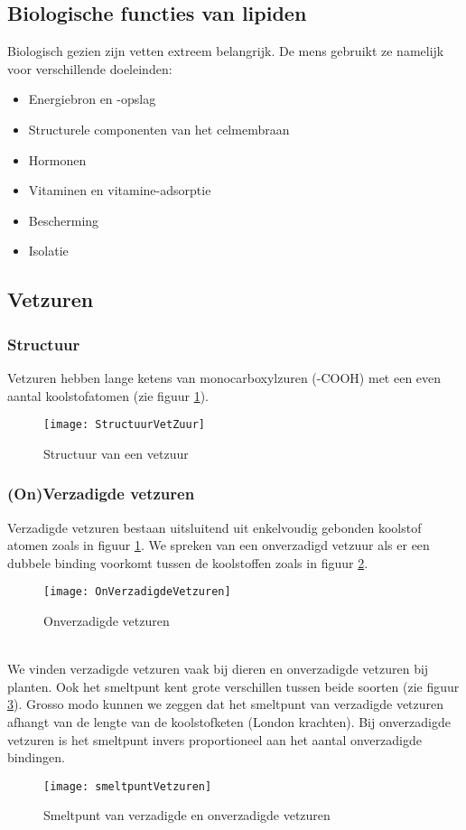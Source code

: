 \documentclass[a4paper,kul]{kulakarticle} %
\begin{document}
\subsection{Biologische functies van lipiden}
Biologisch gezien zijn vetten extreem belangrijk. De mens gebruikt ze namelijk voor verschillende doeleinden:
\begin{itemize}
	\item Energiebron en -opslag
	\item Structurele componenten van het celmembraan
	\item Hormonen
	\item Vitaminen en vitamine-adsorptie
	\item Bescherming
	\item Isolatie
\end{itemize}
\subsection{Vetzuren}
\subsubsection{Structuur}
Vetzuren hebben lange ketens van monocarboxylzuren (-COOH) met een even aantal koolstofatomen (zie figuur \ref{fig:structuurvetzuur}).
\begin{figure}[h]
	\centering
	\texttt{[image: StructuurVetZuur]}
	\caption[Vetzuur]{Structuur van een vetzuur}
	\label{fig:structuurvetzuur}
\end{figure}
\subsubsection{(On)Verzadigde vetzuren}
Verzadigde vetzuren bestaan uitsluitend uit enkelvoudig gebonden koolstof atomen zoals in figuur \ref{fig:structuurvetzuur}. We spreken van een onverzadigd vetzuur als er een dubbele binding voorkomt tussen de koolstoffen zoals in figuur \ref{fig:onverzadigdevetzuren}.
\begin{figure}[h]
	\centering
	\texttt{[image: OnVerzadigdeVetzuren]}
	\caption[Onverzadigde VZ]{Onverzadigde vetzuren}
	\label{fig:onverzadigdevetzuren}
\end{figure}\\
We vinden verzadigde vetzuren vaak bij dieren en onverzadigde vetzuren bij planten. Ook het smeltpunt kent grote verschillen tussen beide soorten (zie figuur \ref{fig:smeltpuntvetzuren}). Grosso modo kunnen we zeggen dat het smeltpunt van verzadigde vetzuren afhangt van de lengte van de koolstofketen (London krachten). Bij onverzadigde vetzuren is het smeltpunt invers proportioneel aan het aantal onverzadigde bindingen. 
\begin{figure}[h]
	\centering
	\texttt{[image: smeltpuntVetzuren]}
	\caption[Smeltpunt]{Smeltpunt van verzadigde en onverzadigde vetzuren}
	\label{fig:smeltpuntvetzuren}
\end{figure}
\end{document}
